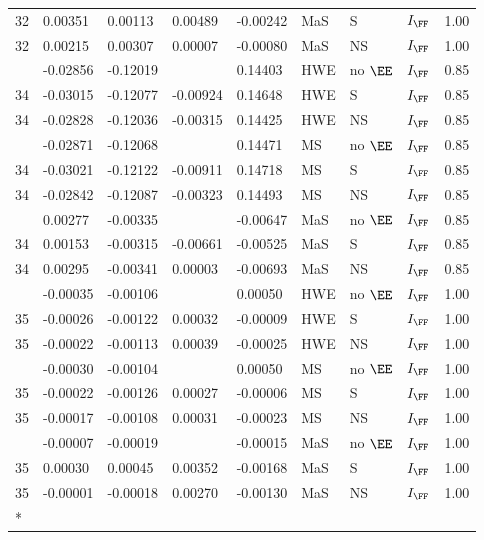 \begin{longtable}[t]{lllllllll}
32 & 0.00351 & 0.00113 & 0.00489 & -0.00242 & MaS & S & $I_{\FF}$ & 1.00\\
32 & 0.00215 & 0.00307 & 0.00007 & -0.00080 & MaS & NS & $I_{\FF}$ & 1.00\\
\addlinespace
34 & -0.02856 & -0.12019 &  & 0.14403 & HWE & no $\EE$ & $I_{\FF}$ & 0.85\\
34 & -0.03015 & -0.12077 & -0.00924 & 0.14648 & HWE & S & $I_{\FF}$ & 0.85\\
34 & -0.02828 & -0.12036 & -0.00315 & 0.14425 & HWE & NS & $I_{\FF}$ & 0.85\\
\addlinespace
34 & -0.02871 & -0.12068 &  & 0.14471 & MS & no $\EE$ & $I_{\FF}$ & 0.85\\
34 & -0.03021 & -0.12122 & -0.00911 & 0.14718 & MS & S & $I_{\FF}$ & 0.85\\
34 & -0.02842 & -0.12087 & -0.00323 & 0.14493 & MS & NS & $I_{\FF}$ & 0.85\\
\addlinespace
34 & 0.00277 & -0.00335 &  & -0.00647 & MaS & no $\EE$ & $I_{\FF}$ & 0.85\\
34 & 0.00153 & -0.00315 & -0.00661 & -0.00525 & MaS & S & $I_{\FF}$ & 0.85\\
34 & 0.00295 & -0.00341 & 0.00003 & -0.00693 & MaS & NS & $I_{\FF}$ & 0.85\\
\addlinespace
35 & -0.00035 & -0.00106 &  & 0.00050 & HWE & no $\EE$ & $I_{\FF}$ & 1.00\\
35 & -0.00026 & -0.00122 & 0.00032 & -0.00009 & HWE & S & $I_{\FF}$ & 1.00\\
35 & -0.00022 & -0.00113 & 0.00039 & -0.00025 & HWE & NS & $I_{\FF}$ & 1.00\\
\addlinespace
35 & -0.00030 & -0.00104 &  & 0.00050 & MS & no $\EE$ & $I_{\FF}$ & 1.00\\
35 & -0.00022 & -0.00126 & 0.00027 & -0.00006 & MS & S & $I_{\FF}$ & 1.00\\
35 & -0.00017 & -0.00108 & 0.00031 & -0.00023 & MS & NS & $I_{\FF}$ & 1.00\\
\addlinespace
35 & -0.00007 & -0.00019 &  & -0.00015 & MaS & no $\EE$ & $I_{\FF}$ & 1.00\\
35 & 0.00030 & 0.00045 & 0.00352 & -0.00168 & MaS & S & $I_{\FF}$ & 1.00\\
35 & -0.00001 & -0.00018 & 0.00270 & -0.00130 & MaS & NS & $I_{\FF}$ & 1.00\\*
\end{longtable}